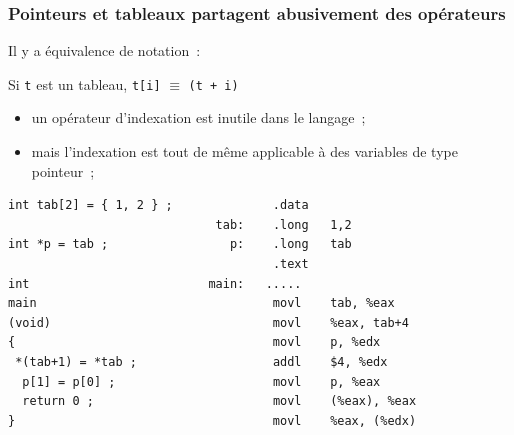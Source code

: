 \begin{frame}[fragile]
    \frametitle{Pointeurs et tableaux partagent abusivement des op\'erateurs}
    Il y a \'equivalence de notation~:
    \begin{center}
        Si {\tt t} est un tableau,  {\tt t[i]} $\equiv$ {\tt *(t
        + i)}
    \end{center}
\begin{itemize}
  \item un op\'erateur d'indexation est inutile dans le langage~;
  \item mais l'indexation est tout de m\^eme applicable \`a des variables de type
    pointeur~;
\end{itemize}
\begin{verbatim}
int tab[2] = { 1, 2 } ;              .data                 
                             tab:    .long   1,2
int *p = tab ;                 p:    .long   tab               
                                     .text                 
int                         main:   .....                  
main                                 movl    tab, %eax     
(void)                               movl    %eax, tab+4   
{                                    movl    p, %edx       
 *(tab+1) = *tab ;                   addl    $4, %edx      
  p[1] = p[0] ;                      movl    p, %eax       
  return 0 ;                         movl    (%eax), %eax  
}                                    movl    %eax, (%edx)  
\end{verbatim}
\end{frame}
